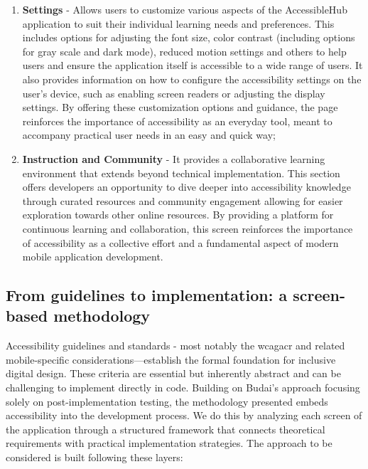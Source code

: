 \begin{enumerate}
\item \textbf{Settings} - Allows users to customize various aspects of the AccessibleHub application to suit their individual learning needs and preferences. This includes options for adjusting the font size, color contrast (including options for gray scale and dark mode), reduced motion settings and others to help users and ensure the application itself is accessible to a wide range of users. It also provides information on how to configure the accessibility settings on the user's device, such as enabling screen readers or adjusting the display settings. By offering these customization options and guidance, the page reinforces the importance of accessibility as an everyday tool, meant to accompany practical user needs in an easy and quick way;

\item \textbf{Instruction and Community} - It provides a collaborative learning environment that extends beyond technical implementation. This section offers developers an opportunity to dive deeper into accessibility knowledge through curated resources and community engagement allowing for easier exploration towards other online resources. By providing a platform for continuous learning and collaboration, this screen reinforces the importance of accessibility as a collective effort and a fundamental aspect of modern mobile application development.
    
\end{enumerate}

\subsection{From guidelines to implementation: a screen-based methodology}

Accessibility guidelines and standards - most notably the \acrshort{wcagacr}  and related mobile-specific considerations—establish the formal foundation for inclusive digital design. These criteria are essential but inherently abstract and can be challenging to implement directly in code. Building on Budai's approach focusing solely on post-implementation testing, the methodology presented embeds accessibility into the development process. We do this by analyzing each screen of the application through a structured framework that connects theoretical requirements with practical implementation strategies. The approach to be considered is built following these layers:

